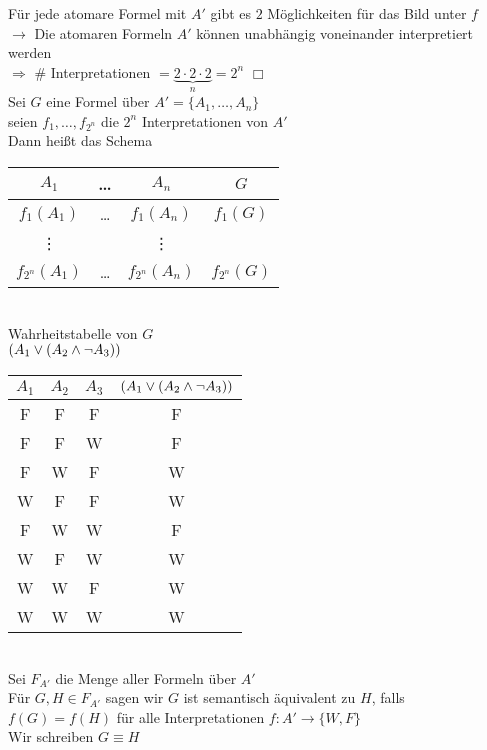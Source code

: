 \beweis{}
Für jede atomare Formel mit $A'$ gibt es $2$ Möglichkeiten für das Bild unter $f$\\
$\rightarrow$ Die atomaren Formeln $A'$ können unabhängig voneinander interpretiert werden\\
$\Rightarrow$ $\#$ Interpretationen $=\underbrace{2 \cdot 2 \cdot 2}_n = 2^n$ \hspace{1cm}\ensuremath{\Box}\\

Sei $G$ eine Formel über $A' = \{A_1, …, A_n \}$\\
seien $f_1, …, f_{2^n}$ die $2^n$ Interpretationen von $A'$\\
Dann heißt das Schema\\
\begin{tabular}{c|c|c|c}
$A_1$ & … & $A_n$ & $G$\\
\hline
$f_1 (A_1)$ & … & $f_1 (A_n)$ & $f_1 (G)$\\
\vdots & & \vdots & \\
$f_{2^n} (A_1)$ & … & $f_{2^n} (A_n)$ & $f_{2^n} (G)$
\end{tabular}\\
Wahrheitstabelle von $G$\\

\beispiel{}
$(A_1 \vee (A_2 \wedge \neg A_3))$\\

\begin{tabular}{c|c|c|c}
$A_1$ & $A_2$ & $A_3$ & $(A_1 \vee (A_2 \wedge \neg A_3))$\\
\hline
F & F & F & F\\
F & F & W & F\\
F & W & F & W\\
W & F & F & W\\
F & W & W & F\\
W & F & W & W\\
W & W & F & W\\
W & W & W & W\\
\end{tabular}\\
    
Sei $F_{A'}$ die Menge aller Formeln über $A'$\\
Für $G, H \in F_{A'}$ sagen wir $G$ ist semantisch äquivalent zu $H$, falls $f(G) = f(H)$ für alle Interpretationen $f:A' \rightarrow \{W,F\}$\\
Wir schreiben $G \equiv H$\\